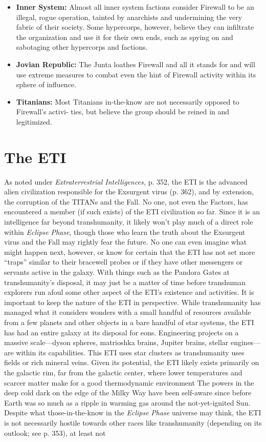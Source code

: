 \begin{itemize} \item \textbf{Inner System:} Almost all inner system factions consider Firewall to be an illegal, rogue operation, tainted by anarchists and undermining the very fabric of their society. Some hypercorps, however, believe they can infiltrate the organization and use it for their own ends, such as spying on and sabotaging other hypercorps and factions. \item \textbf{Jovian Republic:} The Junta loathes Firewall and all it stands for and will use extreme measures to combat even the hint of Firewall activity within its sphere of influence. \item \textbf{Titanians:} Most Titanians in-the-know are not necessarily opposed to Firewall's activi- ties, but believe the group should be reined in and legitimized. \end{itemize} 



\section{The ETI } 

As noted under \textit{Extraterrestrial Intelligences,} p. 352, the ETI is the advanced alien civilization responsible for the Exsurgent virus (p. 362), and by extension, the corruption of the TITANs and the Fall. No one, not even the Factors, has encountered a member (if such exists) of the ETI civilization so far. Since it is an intelligence far beyond transhumanity, it likely won't play much of a direct role within \textit{Eclipse } \textit{Phase}, though those who learn the truth about the Exsurgent virus and the Fall may rightly fear the future. No one can even imagine what might happen next, however, or know for certain that the ETI has not set more ``traps'' similar to their bracewell probes or if they have other messengers or servants active in the galaxy. With things such as the Pandora Gates at transhumanity's disposal, it may just be a matter of time before transhuman explorers run afoul some other aspect of the ETI's existence and activities. It is important to keep the nature of the ETI in perspective. While transhumanity has managed what it considers wonders with a small handful of resources available from a few planets and other objects in a bare handful of star systems, the ETI has had an entire galaxy at its disposal for eons. Engineering projects on a massive scale—dyson spheres, matrioshka brains, Jupiter brains, stellar engines—are within its capabilities. This ETI uses star clusters as transhumanity uses fields or rich mineral veins. Given its potential, the ETI likely exists primarily on the galactic rim, far from the galactic center, where lower temperatures and scarcer matter make for a good thermodynamic environment The powers in the deep cold dark on the edge of the Milky Way have been self-aware since before Earth was so much as a ripple in warming gas around the not-yet-ignited Sun. Despite what those-in-the-know in the \textit{Eclipse } \textit{Phase} universe may think, the ETI is not necessarily hostile towards other races like transhumanity (depending on its outlook; see p. 353), at least not 

